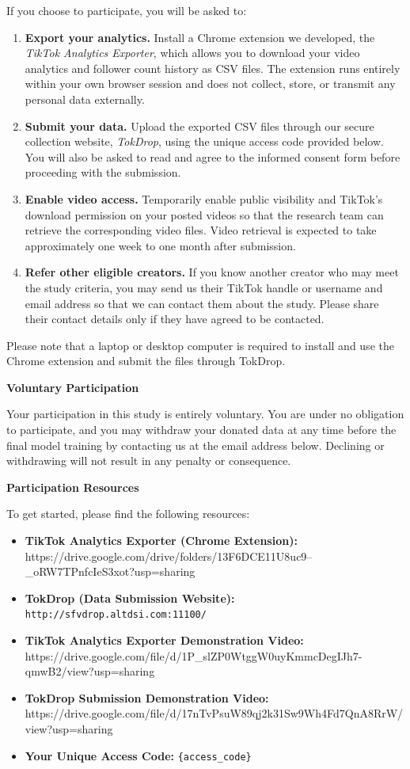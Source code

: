If you choose to participate, you will be asked to:
\begin{enumerate}
    \item \textbf{Export your analytics.} Install a Chrome extension we developed, the \textit{TikTok Analytics Exporter}, which allows you to download your video analytics and follower count history as CSV files. The extension runs entirely within your own browser session and does not collect, store, or transmit any personal data externally.
    \item \textbf{Submit your data.} Upload the exported CSV files through our secure collection website, \textit{TokDrop}, using the unique access code provided below. You will also be asked to read and agree to the informed consent form before proceeding with the submission.
    \item \textbf{Enable video access.} Temporarily enable public visibility and TikTok's download permission on your posted videos so that the research team can retrieve the corresponding video files. Video retrieval is expected to take approximately one week to one month after submission.
    \item \textbf{Refer other eligible creators.} If you know another creator who may meet the study criteria, you may send us their TikTok handle or username and email address so that we can contact them about the study. Please share their contact details only if they have agreed to be contacted.
\end{enumerate}

Please note that a laptop or desktop computer is required to install and use the Chrome extension and submit the files through TokDrop.

\noindent\textbf{Voluntary Participation}

Your participation in this study is entirely voluntary. You are under no obligation to participate, and you may withdraw your donated data at any time before the final model training by contacting us at the email address below. Declining or withdrawing will not result in any penalty or consequence.

\noindent\textbf{Participation Resources}

To get started, please find the following resources:
\begin{itemize}
    \item \textbf{TikTok Analytics Exporter (Chrome Extension):} https://drive.google.com/drive/folders/13F6DCE11U8uc9--\_oRW7TPnfcIeS3xot?usp=sharing
    \item \textbf{TokDrop (Data Submission Website):} \texttt{http://sfvdrop.altdsi.com:11100/}
    \item \textbf{TikTok Analytics Exporter Demonstration Video:} https://drive.google.com/file/d/1P\_slZP0WtggW0uyKmmcDegIJh7-qmwB2/view?usp=sharing
    \item \textbf{TokDrop Submission Demonstration Video:} https://drive.google.com/file/d/17nTvPsuW89qj2k31Sw9Wh4Fd7QnA8RrW/view?usp=sharing
    \item \textbf{Your Unique Access Code:} \texttt{\{access\_code\}}
\end{itemize}

